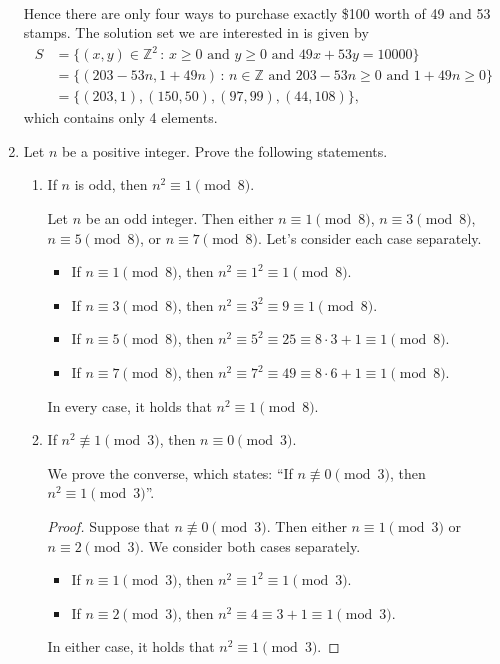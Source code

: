 \documentclass[11pt]{article}
\def\integers{\mathbb{Z}}
\begin{document}
\begin{enumerate}
\begin{Solution}
\begin{align*}
\end{align*}
Hence there are only four ways to purchase exactly \$100 worth of 49\textcent{} and 53\textcent{} stamps. The solution set we are interested in is given by
\begin{align*}
 S &= \{(x,y)\in\integers^2\,:\,x\geq0\text{ and } y\geq0\text{ and } 49x + 53 y = 10000\}\\
   &=\{(203-53n,1+49n)\,:\, n\in\integers\text{ and }203-53n\geq0\text{ and }1+49n\geq0\}\\
   & = \{(203,1),(150,50),(97,99),(44,108)\},
\end{align*}
which contains only 4 elements.\end{Solution}



\item Let $n$ be a positive integer. Prove the following statements.
\begin{enumerate}
 \item If $n$ is odd, then $n^2\equiv 1\pmod{8}$.
 \begin{Solution}
  Let $n$ be an odd integer. Then either $n\equiv 1\pmod{8}$, $n\equiv 3\pmod{8}$, $n\equiv 5\pmod{8}$, or $n\equiv 7\pmod{8}$. Let's consider each case separately.
  \begin{itemize}
   \item If $n\equiv 1\pmod{8}$, then $n^2\equiv 1^2\equiv 1\pmod{8}$.
   \item If $n\equiv 3\pmod{8}$, then $n^2\equiv 3^2\equiv 9\equiv 1\pmod{8}$.
   \item If $n\equiv 5\pmod{8}$, then $n^2\equiv 5^2\equiv 25\equiv 8\cdot 3 + 1\equiv1\pmod{8}$.
   \item If $n\equiv 7\pmod{8}$, then $n^2\equiv 7^2\equiv 49\equiv 8\cdot 6 + 1\equiv1\pmod{8}$.
  \end{itemize}
In every case, it holds that $n^2\equiv 1\pmod{8}$.
 \end{Solution}

 \item If $n^2\not\equiv 1\pmod{3}$, then $n\equiv 0\pmod{3}$.
  \begin{Solution}
  We prove the converse, which states: ``If $n\not\equiv 0\pmod{3}$, then $n^2\equiv 1\pmod{3}$''.
  \begin{proof}
   Suppose that $n\not\equiv 0\pmod{3}$. Then either $n\equiv 1\pmod{3}$ or $n\equiv 2\pmod{3}$. We consider both cases separately.
   \begin{itemize}
   \item If $n\equiv 1\pmod{3}$, then $n^2\equiv 1^2\equiv 1\pmod{3}$.
   \item If $n\equiv 2\pmod{3}$, then $n^2\equiv 4\equiv 3+1\equiv 1\pmod{3}$.
  \end{itemize}
  In either case, it holds that $n^2\equiv 1\pmod{3}$.
  \end{proof}


\end{Solution}
\end{enumerate}
\end{enumerate}
\end{document}
